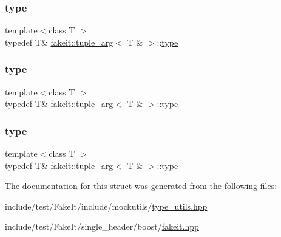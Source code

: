 \subsubsection{\texorpdfstring{type}{type}\hspace{0.1cm}{\footnotesize\ttfamily [7/9]}}
{\footnotesize\ttfamily template$<$class T $>$ \\
typedef T\& \mbox{\hyperlink{structfakeit_1_1tuple__arg}{fakeit\+::tuple\+\_\+arg}}$<$ T \& $>$\+::\mbox{\hyperlink{structfakeit_1_1tuple__arg_3_01T_01_6_01_4_aeee261e6ee2cf07e3bc1fd7783d41a67}{type}}}

\mbox{\label{structfakeit_1_1tuple__arg_3_01T_01_6_01_4_aeee261e6ee2cf07e3bc1fd7783d41a67}} 
\subsubsection{\texorpdfstring{type}{type}\hspace{0.1cm}{\footnotesize\ttfamily [8/9]}}
{\footnotesize\ttfamily template$<$class T $>$ \\
typedef T\& \mbox{\hyperlink{structfakeit_1_1tuple__arg}{fakeit\+::tuple\+\_\+arg}}$<$ T \& $>$\+::\mbox{\hyperlink{structfakeit_1_1tuple__arg_3_01T_01_6_01_4_aeee261e6ee2cf07e3bc1fd7783d41a67}{type}}}

\mbox{\label{structfakeit_1_1tuple__arg_3_01T_01_6_01_4_aeee261e6ee2cf07e3bc1fd7783d41a67}} 
\subsubsection{\texorpdfstring{type}{type}\hspace{0.1cm}{\footnotesize\ttfamily [9/9]}}
{\footnotesize\ttfamily template$<$class T $>$ \\
typedef T\& \mbox{\hyperlink{structfakeit_1_1tuple__arg}{fakeit\+::tuple\+\_\+arg}}$<$ T \& $>$\+::\mbox{\hyperlink{structfakeit_1_1tuple__arg_3_01T_01_6_01_4_aeee261e6ee2cf07e3bc1fd7783d41a67}{type}}}



The documentation for this struct was generated from the following files\+:\begin{DoxyCompactItemize}
\item 
include/test/\+Fake\+It/include/mockutils/\mbox{\hyperlink{type__utils_8hpp}{type\+\_\+utils.\+hpp}}\item 
include/test/\+Fake\+It/single\+\_\+header/boost/\mbox{\hyperlink{single__header_2boost_2fakeit_8hpp}{fakeit.\+hpp}}\end{DoxyCompactItemize}
